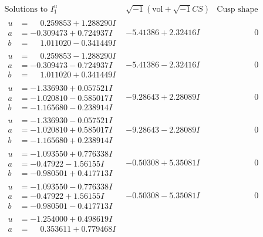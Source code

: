\documentclass[1p]{elsarticle_modified}
\theoremstyle{definition}
\newcommand{\I}{\sqrt{-1}}
\begin{document}
$$\begin{array}{c|c|c}
\text{Solutions to }I^u_{1}& \I (\text{vol} + \sqrt{-1}CS) & \text{Cusp shape}\\
 \hline 
\begin{aligned}
u &= \phantom{-}0.259853 + 1.288290 I \\
a &= -0.309473 + 0.724937 I \\
b &= \phantom{-}1.011020 - 0.341449 I\end{aligned}
 & -5.41386 + 2.32416 I & \phantom{-0.000000 } 0 \\ \hline\begin{aligned}
u &= \phantom{-}0.259853 - 1.288290 I \\
a &= -0.309473 - 0.724937 I \\
b &= \phantom{-}1.011020 + 0.341449 I\end{aligned}
 & -5.41386 - 2.32416 I & \phantom{-0.000000 } 0 \\ \hline\begin{aligned}
u &= -1.336930 + 0.057521 I \\
a &= -1.020810 - 0.585017 I \\
b &= -1.165680 - 0.238914 I\end{aligned}
 & -9.28643 + 2.28089 I & \phantom{-0.000000 } 0 \\ \hline\begin{aligned}
u &= -1.336930 - 0.057521 I \\
a &= -1.020810 + 0.585017 I \\
b &= -1.165680 + 0.238914 I\end{aligned}
 & -9.28643 - 2.28089 I & \phantom{-0.000000 } 0 \\ \hline\begin{aligned}
u &= -1.093550 + 0.776338 I \\
a &= -0.47922 - 1.56155 I \\
b &= -0.980501 + 0.417713 I\end{aligned}
 & -0.50308 + 5.35081 I & \phantom{-0.000000 } 0 \\ \hline\begin{aligned}
u &= -1.093550 - 0.776338 I \\
a &= -0.47922 + 1.56155 I \\
b &= -0.980501 - 0.417713 I\end{aligned}
 & -0.50308 - 5.35081 I & \phantom{-0.000000 } 0 \\ \hline\begin{aligned}
u &= -1.254000 + 0.498619 I \\
a &= \phantom{-}0.353611 + 0.779468 I \\

\end{aligned}
\end{array}$$
\end{document}
